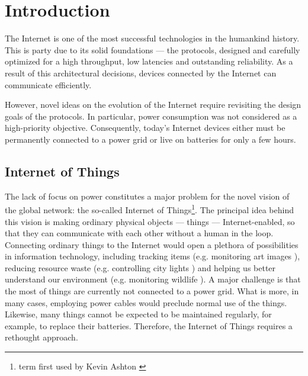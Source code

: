 \chapter{Introduction}
\label{ch:intro}

The Internet is one of the most successful technologies in the humankind history.
This is party due to its solid foundations --- the protocols, designed and carefully optimized for a high throughput, low latencies and outstanding reliability.
As a result of this architectural decisions, devices connected by the Internet can communicate efficiently.

However, novel ideas on the evolution of the Internet require revisiting the design goals of the protocols.
In particular, power consumption was not considered as a high-priority objective.
Consequently, today's Internet devices either must be permanently connected to a power grid or live on batteries for only a few hours.

\section{Internet of Things}

The lack of focus on power constitutes a major problem for the novel vision of the global network: the so-called Internet of Things\footnote{term first used by Kevin Ashton \cite{InternetOfThings}}.
The principal idea behind this vision is making ordinary physical objects --- things --- Internet-enabled, so that they can communicate with each other without a human in the loop.
Connecting ordinary things to the Internet would open a plethora of possibilities in information technology, including tracking items (e.g. monitoring art images \cite{GuArtNet}), reducing resource waste (e.g. controlling city lights \cite{singhvi2005intelligent}) and helping us better understand our environment (e.g. monitoring wildlife \cite{liu2009long}).
A major challenge is that the most of things are currently not connected to a power grid.
What is more, in many cases, employing power cables would preclude normal use of the things.
Likewise, many things cannot be expected to be maintained regularly, for example, to replace their batteries.
Therefore, the Internet of Things requires a rethought approach.


